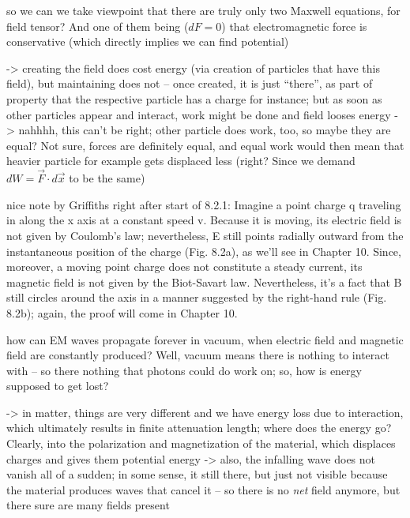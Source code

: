 \documentclass[../class_mech_main.tex]{subfiles}
\begin{document}
so we can we take viewpoint that there are truly only two Maxwell equations, for field tensor? And one of them being ($dF = 0$) that electromagnetic force is conservative (which directly implies we can find potential)



-> creating the field does cost energy (via creation of particles that have this field), but maintaining does not -- once created, it is just \enquote{there}, as part of property that the respective particle has a charge for instance; but as soon as other particles appear and interact, work might be done and field looses energy -> nahhhh, this can't be right; other particle does work, too, so maybe they are equal? Not sure, forces are definitely equal, and equal work would then mean that heavier particle for example gets displaced less (right? Since we demand $dW = \vec{F} \cdot d\vec{x}$ to be the same)



nice note by Griffiths right after start of 8.2.1: Imagine a point charge q traveling in along the x axis at a constant speed v. Because it is moving, its electric field is not given by Coulomb's law; nevertheless, E still points radially outward from the instantaneous position of the charge (Fig. 8.2a), as we'll see in Chapter 10. Since, moreover, a moving point charge does not constitute a steady current, its magnetic field is not given by the Biot-Savart law. Nevertheless, it's a fact that B still circles around the axis in a manner suggested by the right-hand rule (Fig. 8.2b); again, the proof will come in Chapter 10.




how can EM waves propagate forever in vacuum, when electric field and magnetic field are constantly produced? Well, vacuum means there is nothing to interact with -- so there nothing that photons could do work on; so, how is energy supposed to get lost?


-> in matter, things are very different and we have energy loss due to interaction, which ultimately results in finite attenuation length; where does the energy go? Clearly, into the polarization and magnetization of the material, which displaces charges and gives them potential energy  -> also, the infalling wave does not vanish all of a sudden; in some sense, it still there, but just not visible because the material produces waves that cancel it -- so there is no \emph{net} field anymore, but there sure are many fields present
\end{document}
